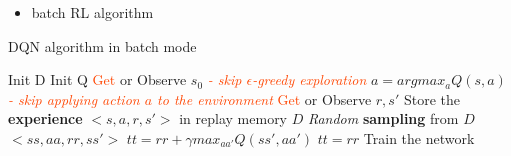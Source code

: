 \documentclass[a4paper,12pt]{article}
\begin{document}
\begin{itemize}
    \item batch RL algorithm
\end{itemize}

\begin{algorithm}[H]
\caption{DQN algorithm in batch mode}
\label{alg:DQN}
\begin{algorithmic}[1]
    \State Init D \Comment{\textcolor{BlueViolet}{replay memory}}
    \State Init Q \Comment{\textcolor{BlueViolet}{Q-table w/ random weights}}
    \State \textcolor{OrangeRed}{Get} or Observe $s_0$ \Comment{\textcolor{BlueViolet}{the initial state}}
            \State \textit{\textcolor{OrangeRed}{- skip $\epsilon$-greedy exploration}}
            \State $a = argmax_a Q(s,a)$
            \State \textit{\textcolor{OrangeRed}{- skip applying action $a$ to the environment}}
            \State \textcolor{OrangeRed}{Get} or Observe $r, s'$
            \State Store the \textbf{experience} $<s, a, r, s'>$ in replay memory $D$
            \State \textit{Random} \textbf{sampling} from $D$ $<ss, aa, rr, ss'>$  \Comment{\textcolor{BlueViolet}{[mini]-batch}}
             \Comment{\textcolor{BlueViolet}{target for each mini-batch}}
                \State $tt = rr + \gamma max_{aa'} Q(ss', aa')$
            \Else
                \State $tt = rr$
            \EndIf
            \State Train the network
        \EndFor    
    \EndFor
\end{algorithmic}
\end{algorithm}

\end{document}
